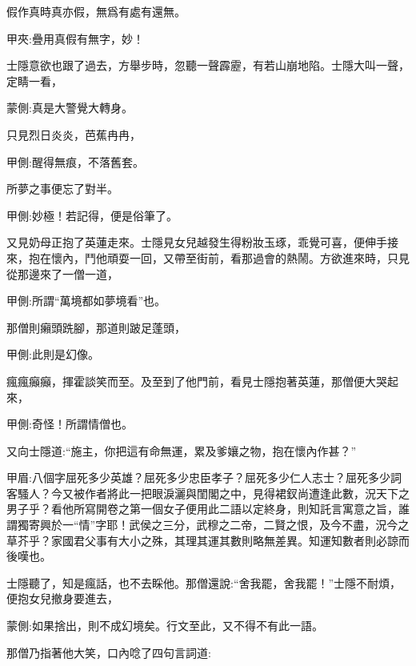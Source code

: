 \begin{poem}
    \begin{pl}假作真時真亦假，無爲有處有還無。\end{pl}
    \begin{note}甲夾:疊用真假有無字，妙！\end{note}
\end{poem}


\begin{parag}
    士隱意欲也跟了過去，方舉步時，忽聽一聲霹靂，有若山崩地陷。士隱大叫一聲，定睛一看，\begin{note}蒙側:真是大警覺大轉身。\end{note}只見烈日炎炎，芭蕉冉冉，\begin{note}甲側:醒得無痕，不落舊套。\end{note}所夢之事便忘了對半。\begin{note}甲側:妙極！若記得，便是俗筆了。\end{note}
\end{parag}


\begin{parag}
    又見奶母正抱了英蓮走來。士隱見女兒越發生得粉妝玉琢，乖覺可喜，便伸手接來，抱在懷內，鬥他頑耍一回，又帶至街前，看那過會的熱鬧。方欲進來時，只見從那邊來了一僧一道，\begin{note}甲側:所謂“萬境都如夢境看”也。\end{note}那僧則癩頭跣腳，那道則跛足蓬頭，\begin{note}甲側:此則是幻像。\end{note}瘋瘋癲癲，揮霍談笑而至。及至到了他門前，看見士隱抱著英蓮，那僧便大哭起來，\begin{note}甲側:奇怪！所謂情僧也。\end{note}又向士隱道:“施主，你把這有命無運，累及爹孃之物，抱在懷內作甚？”\begin{note}甲眉:八個字屈死多少英雄？屈死多少忠臣孝子？屈死多少仁人志士？屈死多少詞客騷人？今又被作者將此一把眼淚灑與閨閣之中，見得裙釵尚遭逢此數，況天下之男子乎？看他所寫開卷之第一個女子便用此二語以定終身，則知託言寓意之旨，誰謂獨寄興於一“情”字耶！武侯之三分，武穆之二帝，二賢之恨，及今不盡，況今之草芥乎？家國君父事有大小之殊，其理其運其數則略無差異。知運知數者則必諒而後嘆也。\end{note}士隱聽了，知是瘋話，也不去睬他。那僧還說:“舍我罷，舍我罷！”士隱不耐煩，便抱女兒撤身要進去，\begin{note}蒙側:如果捨出，則不成幻境矣。行文至此，又不得不有此一語。\end{note}那僧乃指著他大笑，口內唸了四句言詞道:
\end{parag}


